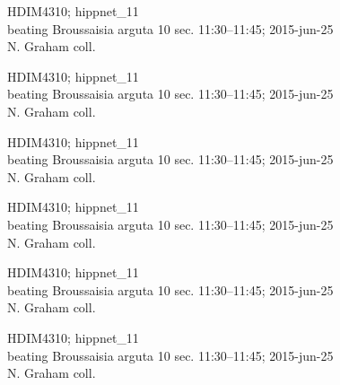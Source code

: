 \documentclass[2pt]{extarticle}
\begin{document}
\noindent
\parbox{0.16\textwidth}{\tiny \raggedright \rule[-0.3\baselineskip]{0pt}{10pt}HDIM4310; hippnet\_11\\ beating Broussaisia arguta 10 sec. 11:30--11:45; 2015-jun-25\\ N. Graham coll.}
\parbox{0.16\textwidth}{\tiny \raggedright \rule[-0.3\baselineskip]{0pt}{10pt}HDIM4310; hippnet\_11\\ beating Broussaisia arguta 10 sec. 11:30--11:45; 2015-jun-25\\ N. Graham coll.}
\parbox{0.16\textwidth}{\tiny \raggedright \rule[-0.3\baselineskip]{0pt}{10pt}HDIM4310; hippnet\_11\\ beating Broussaisia arguta 10 sec. 11:30--11:45; 2015-jun-25\\ N. Graham coll.}
\parbox{0.16\textwidth}{\tiny \raggedright \rule[-0.3\baselineskip]{0pt}{10pt}HDIM4310; hippnet\_11\\ beating Broussaisia arguta 10 sec. 11:30--11:45; 2015-jun-25\\ N. Graham coll.}
\parbox{0.16\textwidth}{\tiny \raggedright \rule[-0.3\baselineskip]{0pt}{10pt}HDIM4310; hippnet\_11\\ beating Broussaisia arguta 10 sec. 11:30--11:45; 2015-jun-25\\ N. Graham coll.}
\parbox{0.16\textwidth}{\tiny \raggedright \rule[-0.3\baselineskip]{0pt}{10pt}HDIM4310; hippnet\_11\\ beating Broussaisia arguta 10 sec. 11:30--11:45; 2015-jun-25\\ N. Graham coll.} \\ 
\vspace{0.001in} 
\end{document}
